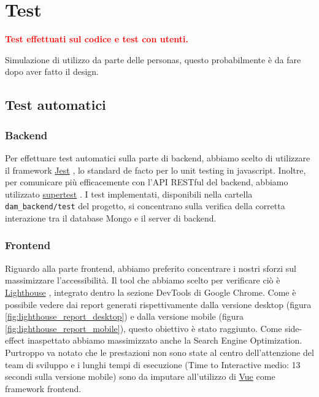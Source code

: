 \documentclass[a4paper,12pt]{report}
\newcommand{\vue}{\href{https://vuejs.org/}{Vue} }
\newcommand{\jest}{\href{https://jestjs.io/}{Jest} }
\newcommand{\supertest}{\href{https://www.npmjs.com/package/supertest}{supertest} }
\newcommand{\lighthouse}{\href{https://chrome.google.com/webstore/detail/lighthouse/blipmdconlkpinefehnmjammfjpmpbjk?hl=it}{Lighthouse} }
\begin{document}
\clearpage
\chapter{Test}\label{sec:testing}
\textcolor{red}{\textbf{Test effettuati sul codice e test con utenti.}}

Simulazione di utilizzo da parte delle personas, questo probabilmente è da fare dopo aver fatto il design.

\section{Test automatici}
\subsection{Backend}
Per effettuare test automatici sulla parte di backend, abbiamo scelto di utilizzare il framework \jest, lo standard de facto per lo unit testing in javascript. Inoltre, per comunicare più efficacemente con l'API RESTful del backend, abbiamo utilizzato \supertest. I test implementati, disponibili nella cartella \texttt{dam\_backend/test} del progetto, si concentrano sulla verifica della corretta interazione tra il database Mongo e il server di backend.

\subsection{Frontend}
Riguardo alla parte frontend, abbiamo preferito concentrare i nostri sforzi sul massimizzare l'accessibilità. Il tool che abbiamo scelto per verificare ciò è \lighthouse, integrato dentro la sezione DevTools di Google Chrome. Come è possibile vedere dai report generati rispettivamente dalla versione desktop (figura \ref{fig:lighthouse_report_desktop}) e dalla versione mobile (figura \ref{fig:lighthouse_report_mobile}), questo obiettivo è stato raggiunto. Come side-effect inaspettato abbiamo massimizzato anche la Search Engine Optimization. Purtroppo va notato che le prestazioni non sono state al centro dell'attenzione del team di sviluppo e i lunghi tempi di esecuzione (Time to Interactive medio: 13 secondi sulla versione mobile) sono da imputare all'utilizzo di \vue come framework frontend.
\end{document}
